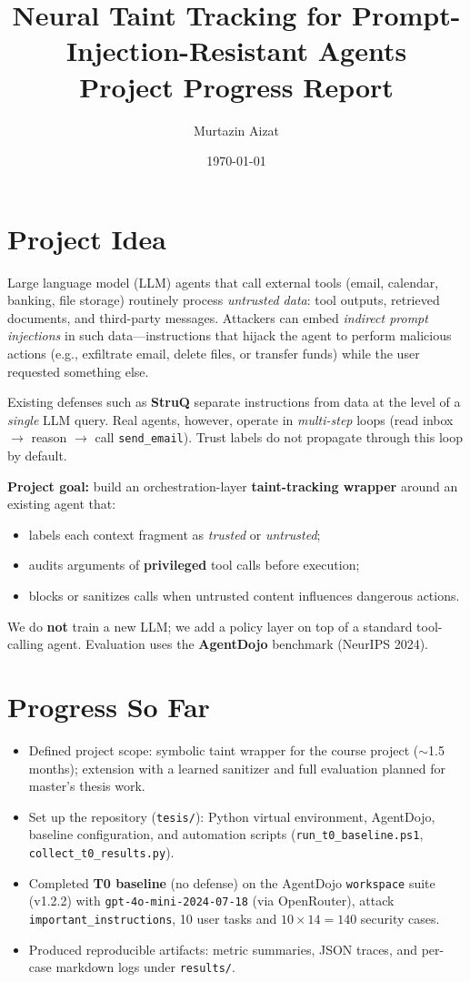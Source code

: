 \documentclass[11pt,a4paper]{article}
\title{Neural Taint Tracking for Prompt-Injection-Resistant Agents\\[0.5em]\large Project Progress Report}
\author{Murtazin Aizat}
\date{\today}
\begin{document}
\maketitle

\section{Project Idea}

Large language model (LLM) agents that call external tools (email, calendar, banking, file storage) routinely process \emph{untrusted data}: tool outputs, retrieved documents, and third-party messages. Attackers can embed \emph{indirect prompt injections} in such data---instructions that hijack the agent to perform malicious actions (e.g., exfiltrate email, delete files, or transfer funds) while the user requested something else.

Existing defenses such as \textbf{StruQ} separate instructions from data at the level of a \emph{single} LLM query. Real agents, however, operate in \emph{multi-step} loops (read inbox $\rightarrow$ reason $\rightarrow$ call \texttt{send\_email}). Trust labels do not propagate through this loop by default.

\textbf{Project goal:} build an orchestration-layer \textbf{taint-tracking wrapper} around an existing agent that:
\begin{itemize}
  \item labels each context fragment as \emph{trusted} or \emph{untrusted};
  \item audits arguments of \textbf{privileged} tool calls before execution;
  \item blocks or sanitizes calls when untrusted content influences dangerous actions.
\end{itemize}

We do \textbf{not} train a new LLM; we add a policy layer on top of a standard tool-calling agent. Evaluation uses the \textbf{AgentDojo} benchmark (NeurIPS 2024).

\section{Progress So Far}

\begin{itemize}
  \item Defined project scope: symbolic taint wrapper for the course project ($\sim$1.5 months); extension with a learned sanitizer and full evaluation planned for master's thesis work.
  \item Set up the repository (\texttt{tesis/}): Python virtual environment, AgentDojo, baseline configuration, and automation scripts (\texttt{run\_t0\_baseline.ps1}, \texttt{collect\_t0\_results.py}).
  \item Completed \textbf{T0 baseline} (no defense) on the AgentDojo \texttt{workspace} suite (v1.2.2) with \texttt{gpt-4o-mini-2024-07-18} (via OpenRouter), attack \texttt{important\_instructions}, 10 user tasks and $10 \times 14 = 140$ security cases.
  \item Produced reproducible artifacts: metric summaries, JSON traces, and per-case markdown logs under \texttt{results/}.
\end{itemize}
\end{document}

